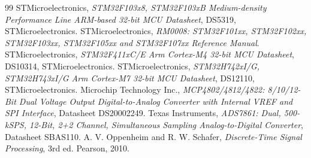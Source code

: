 \documentclass[12pt,a4paper]{report}
\begin{document}
\begin{thebibliography}{99}
 STMicroelectronics, \textit{STM32F103x8, STM32F103xB Medium-density Performance Line ARM-based 32-bit MCU Datasheet}, DS5319, STMicroelectronics.
 STMicroelectronics, \textit{RM0008: STM32F101xx, STM32F102xx, STM32F103xx, STM32F105xx and STM32F107xx Reference Manual}.
 STMicroelectronics, \textit{STM32F411xC/E Arm Cortex-M4 32-bit MCU Datasheet}, DS10314, STMicroelectronics.
 STMicroelectronics, \textit{STM32H742xI/G, STM32H743xI/G Arm Cortex-M7 32-bit MCU Datasheet}, DS12110, STMicroelectronics.
 Microchip Technology Inc., \textit{MCP4802/4812/4822: 8/10/12-Bit Dual Voltage Output Digital-to-Analog Converter with Internal VREF and SPI Interface}, Datasheet DS20002249.
 Texas Instruments, \textit{ADS7861: Dual, 500-kSPS, 12-Bit, 2+2 Channel, Simultaneous Sampling Analog-to-Digital Converter}, Datasheet SBAS110.
 A. V. Oppenheim and R. W. Schafer, \textit{Discrete-Time Signal Processing}, 3rd ed. Pearson, 2010.
\end{thebibliography}
\end{document}
